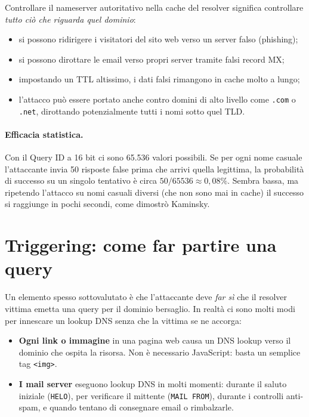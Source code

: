 \documentclass{article}
\begin{document}
Controllare il nameserver autoritativo nella cache del resolver significa
controllare \emph{tutto ciò che riguarda quel dominio}:
\begin{itemize}
    \item si possono ridirigere i visitatori del sito web verso un server
        falso (phishing);
    \item si possono dirottare le email verso propri server tramite falsi
        record MX;
    \item impostando un TTL altissimo, i dati falsi rimangono in cache molto
        a lungo;
    \item l'attacco può essere portato anche contro domini di alto livello
        come \texttt{.com} o \texttt{.net}, dirottando potenzialmente tutti
        i nomi sotto quel TLD.
\end{itemize}

\paragraph{Efficacia statistica.}
Con il Query ID a 16 bit ci sono 65.536 valori possibili. Se per ogni nome
casuale l'attaccante invia 50 risposte false prima che arrivi quella
legittima, la probabilità di successo su un singolo tentativo è circa
$50/65536 \approx 0{,}08\%$. Sembra bassa, ma ripetendo l'attacco su
nomi casuali diversi (che non sono mai in cache) il successo si raggiunge
in pochi secondi, come dimostrò Kaminsky.


\section*{Triggering: come far partire una query}

Un elemento spesso sottovalutato è che l'attaccante deve \emph{far sì} che
il resolver vittima emetta una query per il dominio bersaglio. In realtà
ci sono molti modi per innescare un lookup DNS senza che la vittima se ne
accorga:

\begin{itemize}
    \item \textbf{Ogni link o immagine} in una pagina web causa un DNS
        lookup verso il dominio che ospita la risorsa. Non è necessario
        JavaScript: basta un semplice tag \texttt{<img>}.
    \item \textbf{I mail server} eseguono lookup DNS in molti momenti:
        durante il saluto iniziale (\texttt{HELO}), per verificare il
        mittente (\texttt{MAIL FROM}), durante i controlli anti-spam,
        e quando tentano di consegnare email o rimbalzarle.
\end{itemize}
\end{document}
